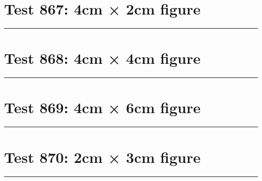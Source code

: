 \documentclass[a4paper,11pt]{article}
\begin{document}
\section*{Test 867: 4cm × 2cm figure}
\begin{swarmwrap}%
  \begin{minipage}[t]{4cm}
    \centering
    \rule{\linewidth}{2cm}
  \end{minipage}%
\end{swarmwrap}%
\swarmwrapnext
\lipsum[147]
\lipsum[148]
\lipsum[149]
\lipsum[150]
\lipsum[1]
\section*{Test 868: 4cm × 4cm figure}
\begin{swarmwrap}%
  \begin{minipage}[t]{4cm}
    \centering
    \rule{\linewidth}{4cm}
  \end{minipage}%
\end{swarmwrap}%
\swarmwrapnext
\lipsum[128]
\lipsum[129]
\lipsum[130]
\lipsum[131]
\section*{Test 869: 4cm × 6cm figure}
\begin{swarmwrap}%
  \begin{minipage}[t]{4cm}
    \centering
    \rule{\linewidth}{6cm}
  \end{minipage}%
\end{swarmwrap}%
\swarmwrapnext
\lipsum[127]
\lipsum[128]
\lipsum[129]
\lipsum[130]
\section*{Test 870: 2cm × 3cm figure}
\begin{swarmwrap}%
  \begin{minipage}[t]{2cm}
    \centering
    \rule{\linewidth}{3cm}
  \end{minipage}%
\end{swarmwrap}%
\swarmwrapnext
\lipsum[61]
\lipsum[62]
\lipsum[63]
\end{document}

